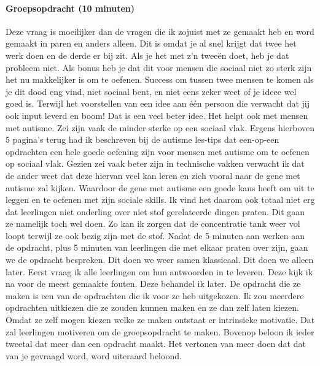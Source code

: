 \documentclass{article}
\begin{document}
                \paragraph{Groepsopdracht (10 minuten)}
                    Deze vraag is moeilijker dan de vragen die ik zojuist met ze gemaakt heb en word gemaakt in paren en anders alleen. Dit is omdat je al snel krijgt dat twee het werk doen en de derde er bij zit. Als je het met z'n tweeën doet, heb je dat probleem niet. Als bonus heb je dat dit voor mensen die sociaal niet zo sterk zijn het nu makkelijker is om te oefenen. Success om tussen twee mensen te komen als je dit dood eng vind, niet sociaal bent, en niet eens zeker weet of je ideee wel goed is. Terwijl het voorstellen van een idee aan één persoon die verwacht dat jij ook input leverd en boom! Dat is een veel beter idee. Het helpt ook met mensen met autisme. Zei zijn vaak de minder sterke op een sociaal vlak. Ergens hierboven 5 pagina's terug had ik beschreven bij de autisme les-tips dat een-op-een opdrachten een hele goede oefening zijn voor mensen met autisme om te oefenen op sociaal vlak. Gezien zei vaak beter zijn in technische vakken verwacht ik dat de ander weet dat deze hiervan veel kan leren en zich vooral naar de gene met autisme zal kijken. Waardoor de gene met autisme een goede kans heeft om uit te leggen en te oefenen met zijn sociale skills. Ik vind het daarom ook totaal niet erg dat leerlingen niet onderling over niet stof gerelateerde dingen praten. Dit gaan ze namelijk toch wel doen. Zo kan ik zorgen dat de concentratie tank weer vol loopt terwijl ze ook bezig zijn met de stof.
                    \bigskip
                    \noindent Nadat de 5 minuten aan werken aan de opdracht, plus 5 minuten van leerlingen die met elkaar praten over zijn, gaan we de opdracht bespreken. Dit doen we weer samen klassicaal. Dit doen we alleen later. Eerst vraag ik alle leerlingen om hun antwoorden in te  leveren. Deze kijk ik na voor de meest gemaakte fouten. Deze behandel ik later.
                    \bigskip
                    \noindent De opdracht die ze maken is een van de opdrachten die ik voor ze heb uitgekozen. Ik zou meerdere opdrachten uitkiezen die ze zouden kunnen maken en ze dan zelf laten kiezen. Omdat ze zelf mogen kiezen welke ze maken ontstaat er intrinsieke motivatie.\cite{NAME-ME} Dat zal leerlingen motiveren om de groepsopdracht te maken. Bovenop beloon ik ieder tweetal dat meer dan een opdracht maakt. Het vertonen van meer doen dat dat van je gevraagd word, word uiteraard beloond.
\end{document}
